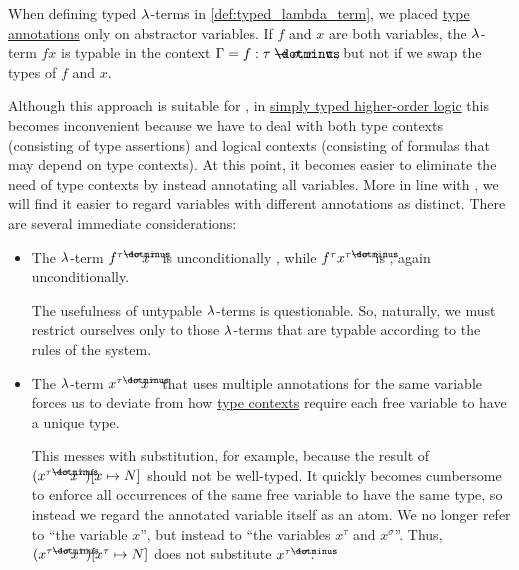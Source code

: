 \begin{remark}\label{rem:simply_typed_hol_type_annotations}
  When defining typed \( {\mathrm \lambda} \)-terms in \cref{def:typed_lambda_term}, we placed \hyperref[con:type_annotation]{type annotations} only on abstractor variables. If \( f \) and \( x \) are both variables, the \( {\mathrm \lambda} \)-term \( fx \) is typable in the context \( \Gamma = f: \tau \synimplies \sigma, x: \tau \), but not if we swap the types of \( f \) and \( x \).

  Although this approach is suitable for , in \hyperref[def:simply_typed_hol]{simply typed higher-order logic} this becomes inconvenient because we have to deal with both type contexts (consisting of type assertions) and logical contexts (consisting of formulas that may depend on type contexts). At this point, it becomes easier to eliminate the need of type contexts by instead annotating all variables. More in line with , we will find it easier to regard variables with different annotations as distinct. There are several immediate considerations:
  \begin{itemize}
    \item The \( {\mathrm \lambda} \)-term \( f^{\tau \synimplies \sigma} x^\tau \) is unconditionally \hyperref[def:typability]{}, while \( f^\tau x^{\tau \synimplies \sigma} \) is , again unconditionally.

    The usefulness of untypable \( {\mathrm \lambda} \)-terms is questionable. So, naturally, we must restrict ourselves only to those \( {\mathrm \lambda} \)-terms that are typable according to the rules of the system.

    \item The \( {\mathrm \lambda} \)-term \( x^{\tau \synimplies \sigma} x^\tau \) that uses multiple annotations for the same variable forces us to deviate from how \hyperref[def:type_context]{type contexts} require each free variable to have a unique type.

    This messes with substitution, for example, because the result of \( (x^{\tau \synimplies \sigma} x^\tau)[x \mapsto N] \) should not be well-typed. It quickly becomes cumbersome to enforce all occurrences of the same free variable to have the same type, so instead we regard the annotated variable itself as an atom. We no longer refer to \enquote{the variable \( x \)}, but instead to \enquote{the variables \( x^\tau \) and \( x^\sigma \)}. Thus, \( (x^{\tau \synimplies \sigma} x^\tau)[x^\tau \mapsto N] \) does not substitute \( x^{\tau \synimplies \sigma} \).


\end{itemize}
\end{remark}
